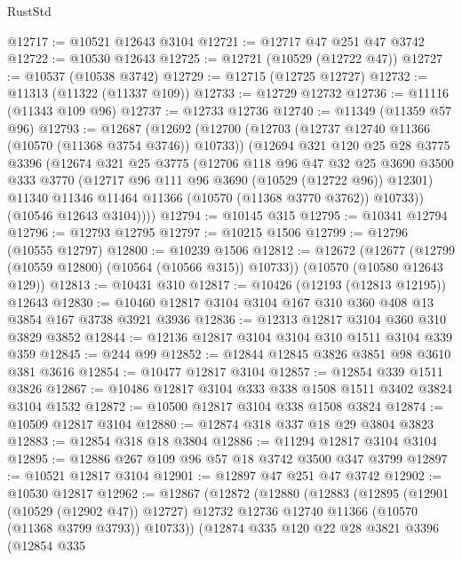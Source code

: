 \begin{lexlean}{RustStd}
\begin{coremodule}
@12717 := @10521 @12643 @3104
@12721 := @12717 @47 @251 @47 @3742
@12722 := @10530 @12643
@12725 := @12721 (@10529 (@12722 @47))
@12727 := @10537 (@10538 @3742)
@12729 := @12715 (@12725 @12727)
@12732 := @11313 (@11322 (@11337 @109))
@12733 := @12729 @12732
@12736 := @11116 (@11343 @109 @96)
@12737 := @12733 @12736
@12740 := @11349 (@11359 @57 @96)
@12793 := @12687
    (@12692
      (@12700
        (@12703 (@12737 @12740 @11366 (@10570 (@11368 @3754 @3746)) @10733))
        (@12694
          @321
          @120
          @25
          @28
          @3775
          @3396
          (@12674
            @321
            @25
            @3775
            (@12706
              @118
              @96
              @47
              @32
              @25
              @3690
              @3500
              @333
              @3770
              (@12717 @96 @111 @96 @3690 (@10529 (@12722 @96)) @12301)
              @11340
              @11346
              @11464
              @11366
              (@10570 (@11368 @3770 @3762))
              @10733))
          (@10546 @12643 @3104))))
@12794 := @10145 @315
@12795 := @10341 @12794
@12796 := @12793 @12795
@12797 := @10215 @1506
@12799 := @12796 (@10555 @12797)
@12800 := @10239 @1506
@12812 := @12672
    (@12677 (@12799 (@10559 @12800) (@10564 (@10566 @315)) @10733))
    (@10570 (@10580 @12643 @129))
@12813 := @10431 @310
@12817 := @10426 (@12193 (@12813 @12195)) @12643
@12830 := @10460 @12817 @3104 @3104 @167 @310 @360 @408 @13 @3854 @167 @3738 @3921 @3936
@12836 := @12313 @12817 @3104 @360 @310 @3829 @3852
@12844 := @12136 @12817 @3104 @3104 @310 @1511 @3104 @339 @359
@12845 := @244 @99
@12852 := @12844 @12845 @3826 @3851 @98 @3610 @381 @3616
@12854 := @10477 @12817 @3104
@12857 := @12854 @339 @1511 @3826
@12867 := @10486 @12817 @3104 @333 @338 @1508 @1511 @3402 @3824 @3104 @1532
@12872 := @10500 @12817 @3104 @338 @1508 @3824
@12874 := @10509 @12817 @3104
@12880 := @12874 @318 @337 @18 @29 @3804 @3823
@12883 := @12854 @318 @18 @3804
@12886 := @11294 @12817 @3104 @3104
@12895 := @12886 @267 @109 @96 @57 @18 @3742 @3500 @347 @3799
@12897 := @10521 @12817 @3104
@12901 := @12897 @47 @251 @47 @3742
@12902 := @10530 @12817
@12962 := @12867
    (@12872
      (@12880
        (@12883
          (@12895
            (@12901 (@10529 (@12902 @47)) @12727)
            @12732
            @12736
            @12740
            @11366
            (@10570 (@11368 @3799 @3793))
            @10733))
        (@12874
          @335
          @120
          @22
          @28
          @3821
          @3396
          (@12854
            @335

\end{coremodule}
\end{lexlean}
